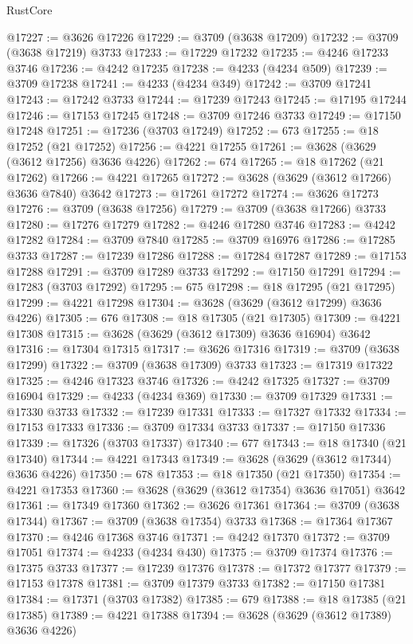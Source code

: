 \begin{lexlean}{RustCore}
\begin{coremodule}
@17227 := @3626 @17226
@17229 := @3709 (@3638 @17209)
@17232 := @3709 (@3638 @17219) @3733
@17233 := @17229 @17232
@17235 := @4246 @17233 @3746
@17236 := @4242 @17235
@17238 := @4233 (@4234 @509)
@17239 := @3709 @17238
@17241 := @4233 (@4234 @349)
@17242 := @3709 @17241
@17243 := @17242 @3733
@17244 := @17239 @17243
@17245 := @17195 @17244
@17246 := @17153 @17245
@17248 := @3709 @17246 @3733
@17249 := @17150 @17248
@17251 := @17236 (@3703 @17249)
@17252 := 673
@17255 := @18 @17252 (@21 @17252)
@17256 := @4221 @17255
@17261 := @3628 (@3629 (@3612 @17256) @3636 @4226)
@17262 := 674
@17265 := @18 @17262 (@21 @17262)
@17266 := @4221 @17265
@17272 := @3628 (@3629 (@3612 @17266) @3636 @7840) @3642
@17273 := @17261 @17272
@17274 := @3626 @17273
@17276 := @3709 (@3638 @17256)
@17279 := @3709 (@3638 @17266) @3733
@17280 := @17276 @17279
@17282 := @4246 @17280 @3746
@17283 := @4242 @17282
@17284 := @3709 @7840
@17285 := @3709 @16976
@17286 := @17285 @3733
@17287 := @17239 @17286
@17288 := @17284 @17287
@17289 := @17153 @17288
@17291 := @3709 @17289 @3733
@17292 := @17150 @17291
@17294 := @17283 (@3703 @17292)
@17295 := 675
@17298 := @18 @17295 (@21 @17295)
@17299 := @4221 @17298
@17304 := @3628 (@3629 (@3612 @17299) @3636 @4226)
@17305 := 676
@17308 := @18 @17305 (@21 @17305)
@17309 := @4221 @17308
@17315 := @3628 (@3629 (@3612 @17309) @3636 @16904) @3642
@17316 := @17304 @17315
@17317 := @3626 @17316
@17319 := @3709 (@3638 @17299)
@17322 := @3709 (@3638 @17309) @3733
@17323 := @17319 @17322
@17325 := @4246 @17323 @3746
@17326 := @4242 @17325
@17327 := @3709 @16904
@17329 := @4233 (@4234 @369)
@17330 := @3709 @17329
@17331 := @17330 @3733
@17332 := @17239 @17331
@17333 := @17327 @17332
@17334 := @17153 @17333
@17336 := @3709 @17334 @3733
@17337 := @17150 @17336
@17339 := @17326 (@3703 @17337)
@17340 := 677
@17343 := @18 @17340 (@21 @17340)
@17344 := @4221 @17343
@17349 := @3628 (@3629 (@3612 @17344) @3636 @4226)
@17350 := 678
@17353 := @18 @17350 (@21 @17350)
@17354 := @4221 @17353
@17360 := @3628 (@3629 (@3612 @17354) @3636 @17051) @3642
@17361 := @17349 @17360
@17362 := @3626 @17361
@17364 := @3709 (@3638 @17344)
@17367 := @3709 (@3638 @17354) @3733
@17368 := @17364 @17367
@17370 := @4246 @17368 @3746
@17371 := @4242 @17370
@17372 := @3709 @17051
@17374 := @4233 (@4234 @430)
@17375 := @3709 @17374
@17376 := @17375 @3733
@17377 := @17239 @17376
@17378 := @17372 @17377
@17379 := @17153 @17378
@17381 := @3709 @17379 @3733
@17382 := @17150 @17381
@17384 := @17371 (@3703 @17382)
@17385 := 679
@17388 := @18 @17385 (@21 @17385)
@17389 := @4221 @17388
@17394 := @3628 (@3629 (@3612 @17389) @3636 @4226)

\end{coremodule}
\end{lexlean}
